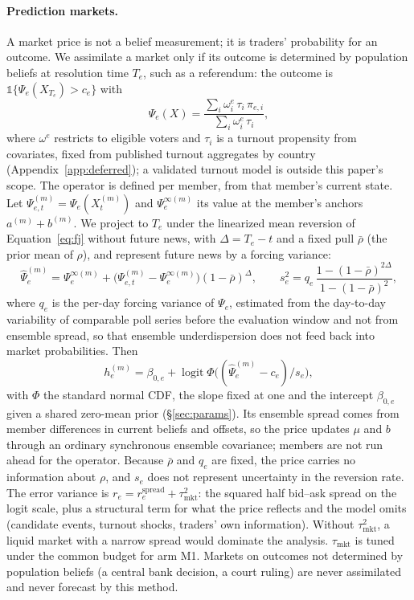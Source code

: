 \documentclass[10pt]{article}
\theoremstyle{remark}
\newcommand{\logit}{\operatorname{logit}}
\begin{document}
\paragraph{Prediction markets.} A market price is not a belief measurement; it is traders' probability for an outcome. We assimilate a market only if its outcome is determined by population beliefs at resolution time $T_e$, such as a referendum: the outcome is $\mathbb{1}\{\Psi_e(X_{T_e})>c_e\}$ with
\[
\Psi_e(X)=\frac{\sum_i \omega^e_i\,\tau_i\,\pi_{e,i}}{\sum_i\omega^e_i\,\tau_i},
\]
where $\omega^e$ restricts to eligible voters and $\tau_i$ is a turnout propensity from covariates, fixed from published turnout aggregates by country (Appendix~\ref{app:deferred}); a validated turnout model is outside this paper's scope. The operator is defined per member, from that member's current state. Let $\Psi^{(m)}_{e,t}=\Psi_e(X^{(m)}_t)$ and $\Psi^{\infty(m)}_e$ its value at the member's anchors $a^{(m)}+b^{(m)}$. We project to $T_e$ under the linearized mean reversion of Equation~\eqref{eq:fj} without future news, with $\Delta=T_e-t$ and a fixed pull $\bar\rho$ (the prior mean of $\rho$), and represent future news by a forcing variance:
\begin{equation}
\hat\Psi^{(m)}_e=\Psi^{\infty(m)}_e+\big(\Psi^{(m)}_{e,t}-\Psi^{\infty(m)}_e\big)(1-\bar\rho)^{\Delta},\qquad
s_e^2=q_e\,\frac{1-(1-\bar\rho)^{2\Delta}}{1-(1-\bar\rho)^2},
\end{equation}
where $q_e$ is the per-day forcing variance of $\Psi_e$, estimated from the day-to-day variability of comparable poll series before the evaluation window and not from ensemble spread, so that ensemble underdispersion does not feed back into market probabilities. Then
\begin{equation}
h_e^{(m)} = \beta_{0,e} + \logit\Phi\big((\hat\Psi^{(m)}_e-c_e)/s_e\big),
\end{equation}
with $\Phi$ the standard normal CDF, the slope fixed at one and the intercept $\beta_{0,e}$ given a shared zero-mean prior (\S\ref{sec:params}). Its ensemble spread comes from member differences in current beliefs and offsets, so the price updates $\mu$ and $b$ through an ordinary synchronous ensemble covariance; members are not run ahead for the operator. Because $\bar\rho$ and $q_e$ are fixed, the price carries no information about $\rho$, and $s_e$ does not represent uncertainty in the reversion rate. The error variance is $r_e=r_e^{\mathrm{spread}}+\tau^2_{\mathrm{mkt}}$: the squared half bid--ask spread on the logit scale, plus a structural term for what the price reflects and the model omits (candidate events, turnout shocks, traders' own information). Without $\tau^2_{\mathrm{mkt}}$, a liquid market with a narrow spread would dominate the analysis. $\tau_{\mathrm{mkt}}$ is tuned under the common budget for arm M1. Markets on outcomes not determined by population beliefs (a central bank decision, a court ruling) are never assimilated and never forecast by this method.
\end{document}

